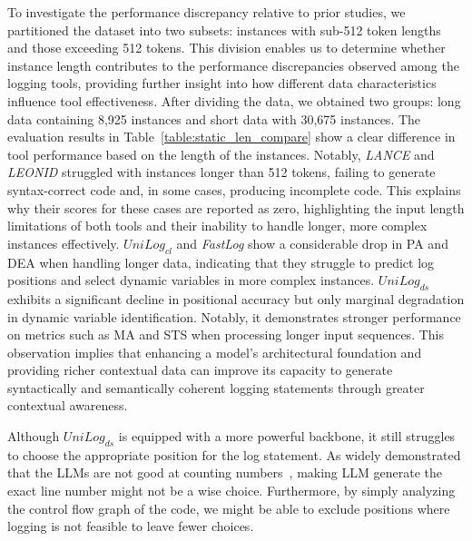 

To investigate the performance discrepancy relative to prior studies, we partitioned the dataset into two subsets: instances with sub-512 token lengths and those exceeding 512 tokens. This division enables us to determine whether instance length contributes to the performance discrepancies observed among the logging tools, providing further insight into how different data characteristics influence tool effectiveness.
After dividing the data, we obtained two groups: long data containing 8,925 instances and short data with 30,675 instances. The evaluation results in Table~\ref{table:static_len_compare} show a clear difference in tool performance based on the length of the instances.
Notably, \textit{LANCE} and \textit{LEONID} struggled with instances longer than 512 tokens, failing to generate syntax-correct code and, in some cases, producing incomplete code. This explains why their scores for these cases are reported as zero, highlighting the input length limitations of both tools and their inability to handle longer, more complex instances effectively.
\(UniLog_{cl}\) and \textit{FastLog} show a considerable drop in PA and DEA when handling longer data, indicating that they struggle to predict log positions and select dynamic variables in more complex instances. \(UniLog_{ds}\) exhibits a significant decline in positional accuracy but only marginal degradation in dynamic variable identification. Notably, it demonstrates stronger performance on metrics such as MA and STS when processing longer input sequences. This observation implies that enhancing a model’s architectural foundation and providing richer contextual data can improve its capacity to generate syntactically and semantically coherent logging statements through greater contextual awareness.

Although \(UniLog_{ds}\) is equipped with a more powerful backbone, it still struggles to choose the appropriate position for the log statement. As widely demonstrated that the LLMs are not good at counting numbers~\cite{Ahn2024LargeLM}, making LLM generate the exact line number might not be a wise choice. Furthermore, by simply analyzing the control flow graph of the code, we might be able to exclude positions where logging is not feasible to leave fewer choices.



